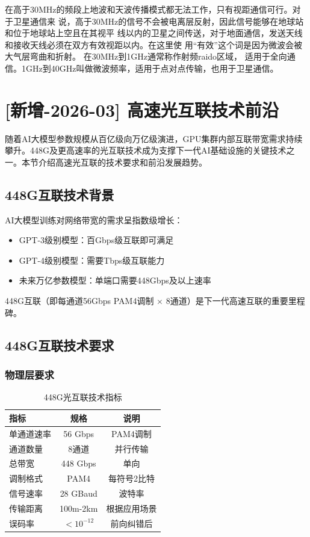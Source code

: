 在高于30MHz的频段上地波和天波传播模式都无法工作，只有视距通信可行。对于卫星通信来
说，高于30MHz的信号不会被电离层反射，因此信号能够在地球站和位于地球站上空且在其视平
线以内的卫星之间传送，对于地面通信，发送天线和接收天线必须在双方有效视距以内。在这里使
用“有效”这个词是因为微波会被大气层弯曲和折射。 在30MHz到1GHz通常称作射频raido区域，
适用于全向通信。1GHz到40GHz叫做微波频率，适用于点对点传输，也用于卫星通信。

\section{[新增-2026-03] 高速光互联技术前沿}

随着AI大模型参数规模从百亿级向万亿级演进，GPU集群内部互联带宽需求持续攀升。448G及更高速率的光互联技术成为支撑下一代AI基础设施的关键技术之一。本节介绍高速光互联的技术要求和前沿发展趋势。

\subsection{448G互联技术背景}

AI大模型训练对网络带宽的需求呈指数级增长：
\begin{itemize}
    \item GPT-3级别模型：百Gbps级互联即可满足
    \item GPT-4级别模型：需要Tbps级互联能力
    \item 未来万亿参数模型：单端口需要448Gbps及以上速率
\end{itemize}

448G互联（即每通道56Gbps PAM4调制 $\times$ 8通道）是下一代高速互联的重要里程碑。

\subsection{448G互联技术要求}

\subsubsection{物理层要求}

\begin{table}[htbp]
\centering
\caption{448G光互联技术指标}
\begin{tabular}{|l|c|c|}
\hline
\textbf{指标} & \textbf{规格} & \textbf{说明} \\
\hline
单通道速率 & 56 Gbps & PAM4调制 \\
\hline
通道数量 & 8通道 & 并行传输 \\
\hline
总带宽 & 448 Gbps & 单向 \\
\hline
调制格式 & PAM4 & 每符号2比特 \\
\hline
信号速率 & 28 GBaud & 波特率 \\
\hline
传输距离 & 100m-2km & 根据应用场景 \\
\hline
误码率 & $<10^{-12}$ & 前向纠错后 \\
\hline
\end{tabular}
\end{table}

